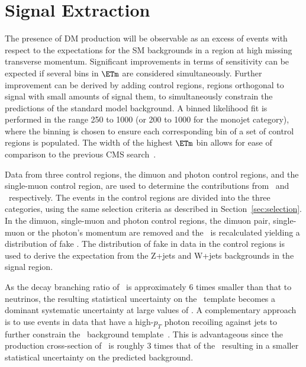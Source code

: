 \section{Signal Extraction}

The presence of DM production will be observable as an excess of events with respect to the expectations for the 
SM backgrounds in a region at high missing transverse momentum. Significant improvements in terms of sensitivity can be expected if 
several bins in $\ETm$ are considered simultaneously. Further
improvement can be derived by adding control regions, regions orthogonal to
signal with small amounts of signal them, to simultaneously
constrain the predictions of the standard model background. A binned likelihood fit is performed in the range 250 \gev to 1000 \gev (or 200 \gev to 1000 \gev 
for the monojet category), where the binning is chosen to ensure each
corresponding bin of a set of control regions is populated. The width of the highest $\ETm$ bin allows for ease of comparison to the previous CMS search~\cite{monojet1}. 

Data from three control regions, the dimuon and photon control regions, and the single-muon control region, are used to determine the contributions from \Zvvjets~and 
\Wlvjets~respectively. The events in the control regions are divided into the three  categories, using the same selection criteria as 
described in Section~\ref{sec:selection}. In the dimuon, single-muon and photon control regions, the dimuon pair, single-muon or the photon's 
momentum are removed and the \ETm ~is recalculated yielding a distribution of fake \ETm. The distribution of fake \ETm 
in data in the control regions is used to derive the expectation from the Z+jets and W+jets backgrounds in the signal region.

As the decay branching ratio of \Zmm~is approximately 6 times smaller than that to neutrinos, the resulting statistical 
uncertainty on the \Zvvjets~template becomes a dominant systematic uncertainty at large values of \ETm.
A complementary approach is to use events in data that have a high-$p_{T}$ 
photon recoiling against jets to further constrain the \Zvvjets~background template~\cite{CMS-PAS-SUS-08-002}. This is advantageous since the production cross-section 
of \phojets~is roughly 3 times that of the \Zvvjets~resulting in a smaller statistical uncertainty on the predicted background. 
 
